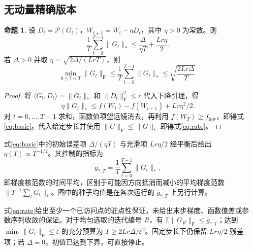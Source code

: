\documentclass[11pt,a4paper]{article}
\theoremstyle{definition}
\newtheorem{theorem}{命题}
\newcommand{\F}{\mathrm{F}}
\newcommand{\Pol}{\mathcal{P}}
\newcommand{\avggrad}{\overline{g}_{*,T}}
\begin{document}
\subsection{无动量精确版本}
\begin{theorem}
设 $D_t=\Pol(G_t)$，$W_{t+1}=W_t-\eta D_t$，其中 $\eta>0$ 为常数。则
\begin{equation}
 \frac1T\sum_{t=0}^{T-1}\|G_t\|_*
 \le\frac{\Delta}{\eta T}+\frac{Lr\eta}{2}.
 \label{eq:basic}
\end{equation}
若 $\Delta>0$ 并取 $\eta=\sqrt{2\Delta/(LrT)}$，则
\begin{equation}
 \min_{0\le t<T}\|G_t\|_\F
 \le\frac1T\sum_{t=0}^{T-1}\|G_t\|_*
 \le\sqrt{\frac{2Lr\Delta}{T}}.
 \label{eq:rate}
\end{equation}
\end{theorem}
\begin{proof}
将 $\langle G_t,D_t\rangle=\|G_t\|_*$ 和 $\|D_t\|_\F^2\le r$ 代入下降引理，得
\[
 \eta\|G_t\|_*\le f(W_t)-f(W_{t+1})+Lr\eta^2/2.
\]
对 $t=0,\ldots,T-1$ 求和，函数值项望远镜消去，再利用 $f(W_T)\ge f_{\mathrm{low}}$，即得式\eqref{eq:basic}。代入给定步长并使用 $\|G\|_\F\le\|G\|_*$ 即得式\eqref{eq:rate}。
\end{proof}

式\eqref{eq:basic}中的初始误差项 $\Delta/(\eta T)$ 与光滑项 $Lr\eta/2$ 经平衡后给出 $\eta(T)\propto T^{-1/2}$。其控制的指标为
\[
 \avggrad=\frac1T\sum_{t=0}^{T-1}\|G_t\|_*,
\]
即梯度核范数的时间平均，区别于可能因方向抵消而减小的平均梯度范数 $\|T^{-1}\sum_tG_t\|_*$。图中的种子均值是在各次运行的 $\avggrad$ 上另行计算。

式\eqref{eq:rate}给出至少一个已访问点的驻点性保证，未给出末步梯度、函数值差或参数序列收敛的保证。对于均匀选取的迭代编号 $R$，有 $\mathbb E\|G_R\|_\F\le\avggrad$；达到 $\min_t\|G_t\|_\F\le\varepsilon$ 的充分预算为 $T\ge2Lr\Delta/\varepsilon^2$。固定步长下仍保留 $Lr\eta/2$ 残差项；若 $\Delta=0$，初值已达到下界，可直接停止。
\end{document}
